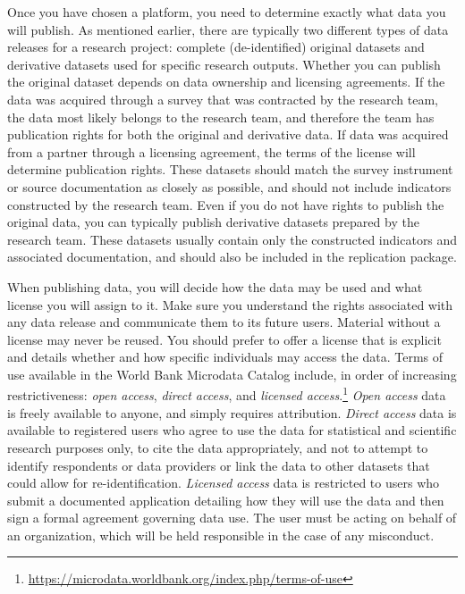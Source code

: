 \documentclass[
]{book}
\begin{document}
Once you have chosen a platform, you need to determine exactly what data you will publish.
As mentioned earlier, there are typically two different types of data releases for a research project:
complete (de-identified) original datasets and derivative datasets used for specific research outputs.
Whether you can publish the original dataset depends on data ownership and licensing agreements.
If the data was acquired through a survey that was contracted by the research team,
the data most likely belongs to the research team,
and therefore the team has publication rights for both the original and derivative data.
If data was acquired from a partner through a licensing agreement,
the terms of the license will determine publication rights.
These datasets should match the survey instrument or source documentation as closely as possible,
and should not include indicators constructed by the research team.
Even if you do not have rights to publish the original data,
you can typically publish derivative datasets prepared by the research team.
These datasets usually contain only the constructed indicators and associated documentation,\cite{dupriez2007}
and should also be included in the replication package.

When publishing data,
you will decide how the data may be used and what license you will assign to it.
Make sure you understand the rights associated with any data release
and communicate them to its future users.
Material without a license may never be reused.
You should prefer to offer a license that is explicit
and details whether and how specific individuals may access the data.
Terms of use available in the World Bank Microdata Catalog include,
in order of increasing restrictiveness:
\emph{open access}, \emph{direct access}, and \emph{licensed access}.\footnote{\url{https://microdata.worldbank.org/index.php/terms-of-use}}
\emph{Open access} data is freely available to anyone, and simply requires attribution.
\emph{Direct access} data is available to registered users who agree
to use the data for statistical and scientific research purposes only,
to cite the data appropriately,
and not to attempt to identify respondents or data providers
or link the data to other datasets that could allow for re-identification.
\emph{Licensed access} data is restricted to users
who submit a documented application detailing
how they will use the data and then sign a formal agreement governing data use.
The user must be acting on behalf of an organization,
which will be held responsible in the case of any misconduct.
\end{document}
